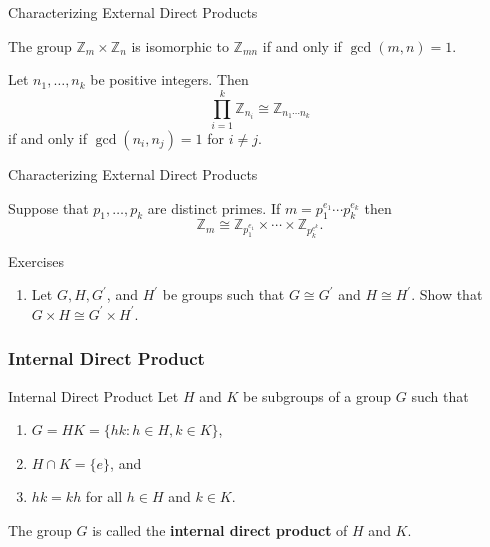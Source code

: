 \documentclass{beamer}
\begin{document}
\begin{frame}{Characterizing External Direct Products}
    \begin{theorem}
        \justifying
        The group $\mathbb{Z}_m \times \mathbb{Z}_n$ is isomorphic to $\mathbb{Z}_{mn}$ if and only if $\gcd(m,n) = 1$.
    \end{theorem}
    \pause
    \begin{corollary}
        \justifying
        Let $n_1, \dots, n_k$ be positive integers. Then
        \[\prod_{i=1}^k\mathbb{Z}_{n_i} \cong \mathbb{Z}_{n_1\cdots n_k}\]
        if and only if $\gcd(n_i, n_j) = 1$ for $i \neq j$.
    \end{corollary}
\end{frame}

\begin{frame}{Characterizing External Direct Products}
    \begin{corollary}
        \justifying
        Suppose that $p_1, \dots, p_k$ are distinct primes. If $m = p_1^{e_1}\cdots p_k^{e_k}$ then
        \[\mathbb{Z}_m \cong \mathbb{Z}_{p_1^{e_1}} \times \cdots \times \mathbb{Z}_{p_k^{e^k}}.\]
    \end{corollary}
\end{frame}

\begin{frame}{Exercises}
    \begin{enumerate}
        \justifying 
        \item Let $G, H, G^{\prime}$, and $H^{\prime}$ be groups such that $G \cong G^{\prime}$ and $H \cong H^{\prime}$. Show that $G \times H \cong G^{\prime} \times H^{\prime}$.
    \end{enumerate}
\end{frame}

\subsubsection{Internal Direct Product}

\begin{frame}{Internal Direct Product}
    \justifying
    Let $H$ and $K$ be subgroups of a group $G$ such that
    \begin{enumerate}
        \item $G = HK = \{hk : h \in H, k \in K\}$,
        \item $H \cap K = \{e\}$, and
        \item $hk = kh$ for all $h \in H$ and $k \in K$.
    \end{enumerate}
    The group $G$ is called the \textbf{internal direct product} of $H$ and $K$.
\end{frame}
\end{document}
